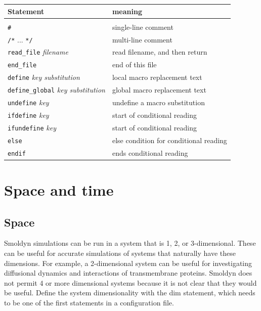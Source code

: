 \documentclass {scrbook}
\newcommand {\ttt} {\texttt}
\newcommand {\param} {\textit}
\begin{document}
\begin{longtable}[c]{ll}
Statement & meaning\\
\hline\\
\ttt{\#} & single-line comment\\
\ttt{/*} ... \ttt{*/} & multi-line comment\\
\ttt{read\_file} \param{filename} & read filename, and then return\\
\ttt{end\_file} & end of this file\\
\ttt{define} \param{key substitution} & local macro replacement text\\
\ttt{define\_global} \param{key substitution} & global macro replacement text\\
\ttt{undefine} \param{key} & undefine a macro substitution\\
\ttt{ifdefine} \param{key} & start of conditional reading\\
\ttt{ifundefine} \param{key} & start of conditional reading\\
\ttt{else} & else condition for conditional reading\\
\ttt{endif} & ends conditional reading\\
\end{longtable}



\chapter{Space and time}

\section{Space}

Smoldyn simulations can be run in a system that is 1, 2, or 3-dimensional. These can be useful for accurate simulations of systems that naturally have these dimensions. For example, a 2-dimensional system can be useful for investigating diffusional dynamics and interactions of transmembrane proteins. Smoldyn does not permit 4 or more dimensional systems because it is not clear that they would be useful. Define the system dimensionality with the dim statement, which needs to be one of the first statements in a configuration file.
\end{document}

